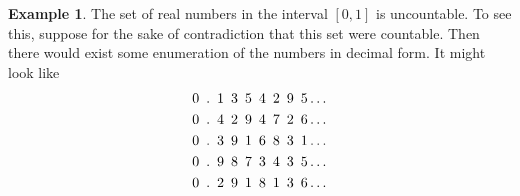 \documentclass{tufte-book}
\theoremstyle{definition}
\numberwithin{theorem}{section}
\numberwithin{definition}{section}
\numberwithin{lemma}{section}
\numberwithin{corollary}{section}
\numberwithin{proposition}{section}
\numberwithin{remark}{section}
\numberwithin{claim}{section}
\numberwithin{observation}{section}
\numberwithin{fact}{section}
\numberwithin{assumption}{section}
\newtheorem{example}[theorem]{Example}
\numberwithin{example}{section}
\numberwithin{exercise}{section}
\begin{document}
\begin{example}
The set of real numbers in the interval $[0,1]$ is uncountable. To see this, suppose for the sake of contradiction that this set were countable. Then there would exist some enumeration of the numbers in decimal form. It might look like
\begin{align*}
&0 \hspace{.5em}.\hspace{.5em}1\hspace{.5em} 3\hspace{.5em} 5\hspace{.5em} 4 \hspace{.5em}2\hspace{.5em} 9\hspace{.5em} 5 \dots \\
&0 \hspace{.5em}.\hspace{.5em}4\hspace{.5em} 2\hspace{.5em} 9\hspace{.5em} 4 \hspace{.5em}7\hspace{.5em} 2\hspace{.5em} 6 \dots \\
&0 \hspace{.5em}.\hspace{.5em}3\hspace{.5em} 9\hspace{.5em} 1\hspace{.5em} 6 \hspace{.5em}8\hspace{.5em} 3\hspace{.5em} 1 \dots \\
&0 \hspace{.5em}.\hspace{.5em}9\hspace{.5em} 8\hspace{.5em} 7\hspace{.5em} 3 \hspace{.5em}4\hspace{.5em} 3\hspace{.5em} 5 \dots \\
&0 \hspace{.5em}.\hspace{.5em}2\hspace{.5em} 9\hspace{.5em} 1\hspace{.5em} 8 \hspace{.5em}1\hspace{.5em} 3\hspace{.5em} 6 \dots \\

\end{align*}
\end{example}
\end{document}
